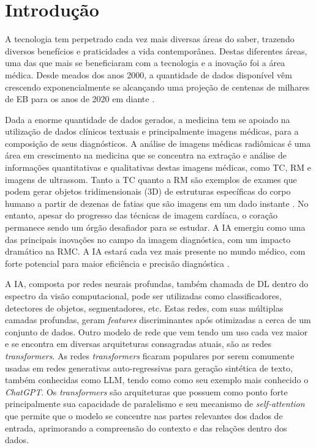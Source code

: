 \chapter{Introdução}
\label{chap:intro}

A tecnologia tem perpetrado cada vez mais diversas áreas do saber, trazendo diversos benefícios e praticidades a vida contemporânea. Destas diferentes áreas, uma das que mais se beneficiaram com a tecnologia e a inovação foi a área médica. Desde meados dos anos 2000, a quantidade de dados disponível vêm crescendo exponencialmente se alcançando uma projeção de centenas de milhares de \gls{EB} para os anos de 2020 em diante \cite{gantzDIGITALUNIVERSE2020}.

Dada a enorme quantidade de dados gerados, a medicina tem se apoiado na utilização de dados clínicos textuais e principalmente imagens médicas, para a composição de seus diagnósticos. A análise de imagens médicas radiômicas é uma área em crescimento na medicina que se concentra na extração e análise de informações quantitativas e qualitativas destas imagens médicas, como \gls{TC}, \gls{RM} e imagens de ultrassom. Tanto a \gls{TC} quanto a \gls{RM} são exemplos de exames que podem gerar objetos tridimensionais (3D) de estruturas específicas do corpo humano a partir de dezenas de fatias que são imagens em um dado instante \cite{book:1355375}. No entanto, apesar do progresso das técnicas de imagem cardíaca, o coração permanece sendo um órgão desafiador para se estudar. A \gls{IA} emergiu como uma das principais inovações no campo da imagem diagnóstica, com um impacto dramático na \gls{RMC}. A \gls{IA} estará cada vez mais presente no mundo médico, com forte potencial para maior eficiência e precisão diagnóstica \cite{argentieroApplicationsArtificialIntelligence2022}.

A IA, composta por redes neurais profundas, também chamada de \gls{DL} dentro do espectro da visão computacional, pode ser utilizadas como classificadores, detectores de objetos, segmentadores, etc. Estas redes, com suas múltiplas camadas profundas, geram \textit{features} discriminantes após otimizadas a cerca de um conjunto de dados. Outro modelo de rede que vem tendo um uso cada vez maior e se encontra em diversas arquiteturas consagradas atuais, são as redes \textit{transformers}. As redes \textit{transformers} ficaram populares por serem comumente usadas em redes generativas auto-regressivas para geração sintética de texto, também conhecidas como \gls{LLM}, tendo como como seu exemplo mais conhecido o \textit{ChatGPT}. Os \textit{transformers} são arquiteturas que possuem como ponto forte principalmente sua capacidade de paralelismo e seu mecanismo de \textit{self-attention} que permite que o modelo se concentre nas partes relevantes dos dados de entrada, aprimorando a compreensão do contexto e das relações dentro dos dados.

